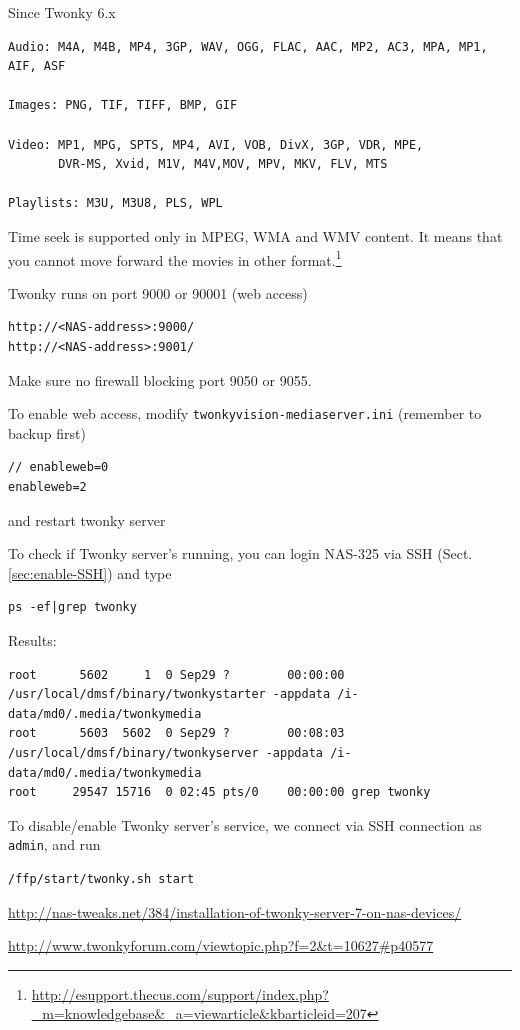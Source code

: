 Since Twonky 6.x
\begin{verbatim}
Audio: M4A, M4B, MP4, 3GP, WAV, OGG, FLAC, AAC, MP2, AC3, MPA, MP1, AIF, ASF 

Images: PNG, TIF, TIFF, BMP, GIF

Video: MP1, MPG, SPTS, MP4, AVI, VOB, DivX, 3GP, VDR, MPE, 
       DVR-MS, Xvid, M1V, M4V,MOV, MPV, MKV, FLV, MTS

Playlists: M3U, M3U8, PLS, WPL
\end{verbatim}

Time seek is supported only in MPEG, WMA and WMV content. It means that you
cannot move forward the movies in other
format.\footnote{\url{http://esupport.thecus.com/support/index.php?_m=knowledgebase&_a=viewarticle&kbarticleid=207}}

Twonky runs on port 9000 or 90001 (web access)
\begin{verbatim}
http://<NAS-address>:9000/
http://<NAS-address>:9001/
\end{verbatim}
Make sure no firewall blocking port 9050 or 9055.

To enable web access, modify \verb!twonkyvision-mediaserver.ini! (remember to
backup first)
\begin{verbatim}
// enableweb=0
enableweb=2
\end{verbatim}
and restart twonky server

To check if Twonky server's running, you can login NAS-325
via SSH (Sect.\ref{sec:enable-SSH}) and type
\begin{verbatim}
ps -ef|grep twonky
\end{verbatim}

Results:
{\small
\begin{verbatim}
root      5602     1  0 Sep29 ?        00:00:00 /usr/local/dmsf/binary/twonkystarter -appdata /i-data/md0/.media/twonkymedia
root      5603  5602  0 Sep29 ?        00:08:03 /usr/local/dmsf/binary/twonkyserver -appdata /i-data/md0/.media/twonkymedia
root     29547 15716  0 02:45 pts/0    00:00:00 grep twonky
\end{verbatim}
}

To disable/enable Twonky server's service, we connect via SSH connection
as \verb!admin!, and run
\begin{verbatim}
/ffp/start/twonky.sh start	
\end{verbatim}


\url{http://nas-tweaks.net/384/installation-of-twonky-server-7-on-nas-devices/}

\url{http://www.twonkyforum.com/viewtopic.php?f=2&t=10627#p40577}

